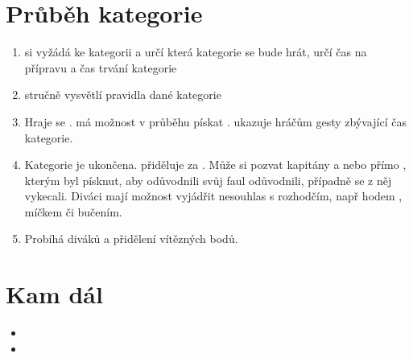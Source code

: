 \section{ Průběh kategorie } \begin{enumerate}
\item  {} si vyžádá  ke kategorii a určí která kategorie se bude hrát, určí čas na přípravu a čas trvání kategorie
\item  {} stručně vysvětlí pravidla dané kategorie
\item  Hraje se .  má možnost v průběhu pískat .  ukazuje hráčům gesty zbývající čas kategorie.
\item  Kategorie je ukončena.  přiděluje  za . Může si pozvat kapitány a nebo přímo , kterým byl  písknut, aby odůvodnili svůj faul odůvodnili, případně se z něj vykecali. Diváci mají možnost vyjádřit nesouhlas s rozhodčím, např hodem , míčkem či bučením.
\item  Probíhá  diváků a přidělení vítězných bodů.
\end{enumerate}
 
\section{ Kam dál } \begin{itemize}
\item  {}
\item  {}
\end{itemize}
 
 
 
 
